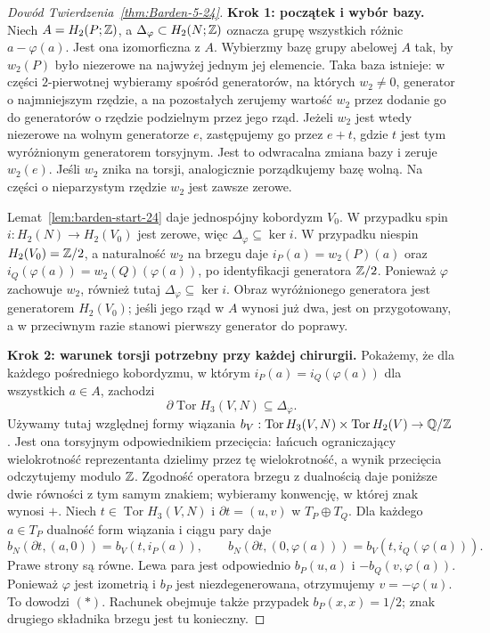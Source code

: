 \begin{proof}[Dowód Twierdzenia~\ref{thm:Barden-5-24}]
\textbf{Krok 1: początek i wybór bazy.}
Niech $A=H_2(P;\mathbb{Z})$, a
$\Delta_\varphi\subset H_2(N;\mathbb{Z})$
oznacza grupę wszystkich różnic
$a-\varphi(a)$. Jest ona izomorficzna
z $A$. Wybierzmy bazę grupy abelowej
$A$ tak, by $w_2(P)$ było niezerowe
na najwyżej jednym jej elemencie.
Taka baza istnieje: w części
$2$-pierwotnej wybieramy spośród
generatorów, na których $w_2\ne0$,
generator o najmniejszym rzędzie,
a na pozostałych zerujemy wartość
$w_2$ przez dodanie go do generatorów
o rzędzie podzielnym przez jego rząd.
Jeżeli $w_2$ jest wtedy niezerowe
na wolnym generatorze $e$, zastępujemy
go przez $e+t$, gdzie $t$ jest tym
wyróżnionym generatorem torsyjnym.
Jest to odwracalna zmiana bazy i
zeruje $w_2(e)$.
Jeśli $w_2$ znika na torsji,
analogicznie porządkujemy bazę wolną.
Na części o nieparzystym rzędzie
$w_2$ jest zawsze zerowe.

Lemat~\ref{lem:barden-start-24} daje
jednospójny kobordyzm $V_0$.
W przypadku spin $i\colon H_2(N)\to
H_2(V_0)$ jest zerowe, więc
$\Delta_\varphi\subseteq\ker i$.
W przypadku niespin $H_2(V_0)=\mathbb{Z}/2$,
a naturalność $w_2$ na brzegu daje
$i_P(a)=w_2(P)(a)$ oraz
$i_Q(\varphi(a))=w_2(Q)(\varphi(a))$,
po identyfikacji generatora $\mathbb{Z}/2$.
Ponieważ $\varphi$ zachowuje $w_2$,
również tutaj
$\Delta_\varphi\subseteq\ker i$.
Obraz wyróżnionego generatora jest
generatorem $H_2(V_0)$; jeśli jego
rząd w $A$ wynosi już dwa, jest on
przygotowany, a w przeciwnym razie
stanowi pierwszy generator do poprawy.

\textbf{Krok 2: warunek torsji potrzebny
przy każdej chirurgii.}
Pokażemy, że dla każdego pośredniego
kobordyzmu, w którym
$i_P(a)=i_Q(\varphi(a))$ dla wszystkich
$a\in A$, zachodzi
\[
 \partial\operatorname{Tor}H_3(V,N)
 \subseteq\Delta_\varphi.
 \tag{$*$}
\]
Używamy tutaj względnej formy wiązania
$b_V:\operatorname{Tor}H_3(V,N)\times
\operatorname{Tor}H_2(V)\to\mathbb{Q}/\mathbb{Z}$.
Jest ona torsyjnym odpowiednikiem przecięcia:
łańcuch ograniczający wielokrotność reprezentanta
dzielimy przez tę wielokrotność, a wynik przecięcia
odczytujemy modulo $\mathbb{Z}$. Zgodność operatora brzegu
z dualnością daje poniższe dwie równości z tym samym
znakiem; wybieramy konwencję, w której znak wynosi $+$.
Niech $t\in\operatorname{Tor}H_3(V,N)$
i $\partial t=(u,v)$ w
$T_P\oplus T_Q$. Dla każdego
$a\in T_P$ dualność form wiązania
i ciągu pary daje
\[
 b_N(\partial t,(a,0))
   =b_V(t,i_P(a)),\qquad
 b_N(\partial t,(0,\varphi(a)))
   =b_V(t,i_Q(\varphi(a))).
\]
Prawe strony są równe. Lewa para
jest odpowiednio
$b_P(u,a)$ i $-b_Q(v,\varphi(a))$.
Ponieważ $\varphi$ jest izometrią
i $b_P$ jest niezdegenerowana,
otrzymujemy $v=-\varphi(u)$.
To dowodzi $(*)$. Rachunek obejmuje
także przypadek $b_P(x,x)=1/2$;
znak drugiego składnika brzegu
jest tu konieczny.


\end{proof}
